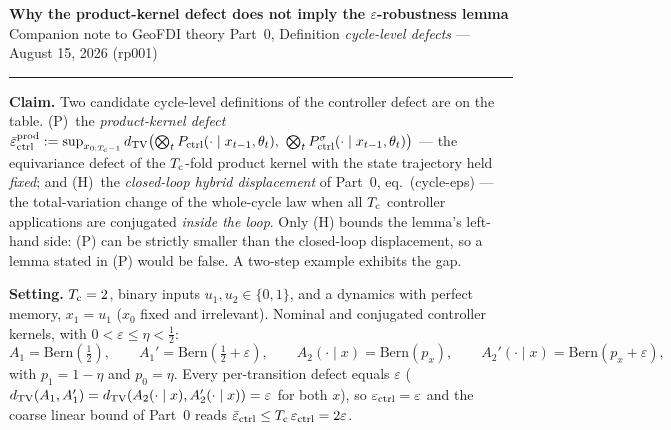 \documentclass[10pt]{article}
\begin{document}
\noindent\textbf{Why the product-kernel defect does not imply the
$\varepsilon$-robustness lemma}\\
{\small Companion note to GeoFDI theory Part~0, Definition
\emph{cycle-level defects} --- August 15, 2026 (rp001)}
\vspace{0.4em}\hrule\vspace{0.6em}

\noindent\textbf{Claim.}
Two candidate cycle-level definitions of the controller defect are on the
table. (P)~the \emph{product-kernel defect}
$\bar\varepsilon_{\mathrm{ctrl}}^{\mathrm{prod}} := \sup_{x_{0:T_{\mathrm{c}}-1}} d_{\mathrm{TV}}\bigl(\bigotimes_t
P_{\mathrm{ctrl}}(\cdot\mid x_{t-1},\theta_t),\ \bigotimes_t
P^{\sigma}_{\mathrm{ctrl}}(\cdot\mid x_{t-1},\theta_t)\bigr)$ --- the
equivariance defect of the $T_{\mathrm{c}}$-fold product kernel with the state
trajectory held \emph{fixed}; and (H)~the \emph{closed-loop hybrid
displacement} of Part~0, eq.~(cycle-eps) --- the total-variation change of
the whole-cycle law when all $T_{\mathrm{c}}$ controller applications are conjugated
\emph{inside the loop}. Only (H) bounds the lemma's left-hand side: (P) can be
strictly smaller than the closed-loop displacement, so a lemma stated in (P)
would be false. A two-step example exhibits the gap.

\noindent\textbf{Setting.}
$T_{\mathrm{c}}=2$, binary inputs $u_1,u_2\in\{0,1\}$, and a dynamics with perfect
memory, $x_1=u_1$ ($x_0$ fixed and irrelevant). Nominal and conjugated
controller kernels, with $0<\varepsilon\le\eta<\tfrac12$:
\[
  A_1=\mathrm{Bern}(\tfrac12),\qquad A_1'=\mathrm{Bern}(\tfrac12+\varepsilon),\qquad
  A_2(\cdot\mid x)=\mathrm{Bern}(p_x),\qquad A_2'(\cdot\mid x)=\mathrm{Bern}(p_x+\varepsilon),
\]
with $p_1=1-\eta$ and $p_0=\eta$.
Every per-transition defect equals $\varepsilon$
($d_{\mathrm{TV}}(A_1,A_1')=d_{\mathrm{TV}}(A_2(\cdot\mid x),A_2'(\cdot\mid x))=\varepsilon$ for both
$x$), so $\varepsilon_{\mathrm{ctrl}}=\varepsilon$ and the coarse linear bound of Part~0 reads
$\bar\varepsilon_{\mathrm{ctrl}}\le T_{\mathrm{c}}\,\varepsilon_{\mathrm{ctrl}}=2\varepsilon$.
\end{document}
